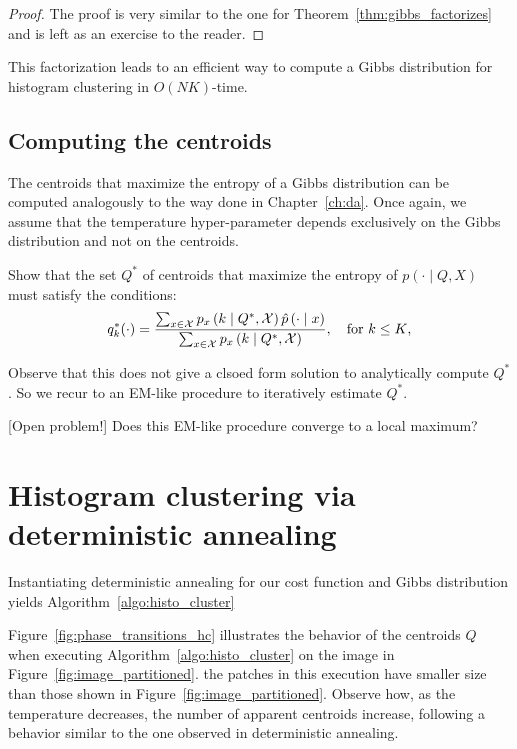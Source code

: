 \begin{proof}
The proof is very similar to the one for Theorem~\ref{thm:gibbs_factorizes} and is left as an exercise to the reader.
\end{proof}

This factorization leads to an efficient way to compute a Gibbs distribution for histogram clustering in $O(NK)$-time.

\subsection{Computing the centroids}

The centroids that maximize the entropy of a Gibbs distribution can be computed analogously to the way done in Chapter~\ref{ch:da}. Once again, we assume that the temperature hyper-parameter depends exclusively on the Gibbs distribution and not on the centroids.

\begin{exercise}
Show that the set $Q^*$ of centroids that maximize the entropy of $p(\cdot \mid Q, X)$ must satisfy the conditions:
%
\begin{equation}
q^*_k(\cdot) = \frac{\sum_{x \in \mathcal{X}}p_{x} \left(k\mid Q^*, \mathcal{X}\right)\hat{p}\left(\cdot \mid x\right)}{\sum_{x \in \mathcal{X}} p_{x} \left(k\mid Q^*, \mathcal{X}\right)}, \quad \text{for $k \leq K$,}
\end{equation}
%
\end{exercise}

Observe that this does not give a clsoed form solution to analytically compute $Q^*$. So we recur to an EM-like procedure to iteratively estimate $Q^*$.

\begin{exercise}{[Open problem!]}
Does this EM-like procedure converge to a local maximum?
\end{exercise}

\section{Histogram clustering via deterministic annealing}

Instantiating deterministic annealing for our cost function and Gibbs distribution yields Algorithm~\ref{algo:histo_cluster}

Figure~\ref{fig:phase_transitions_hc} illustrates the behavior of the centroids $Q$ when executing Algorithm~\ref{algo:histo_cluster} on the image in Figure~\ref{fig:image_partitioned}. the patches in this execution have smaller size than those shown in Figure~\ref{fig:image_partitioned}. Observe how, as the temperature decreases, the number of apparent centroids increase, following a behavior similar to the one observed in deterministic annealing.

